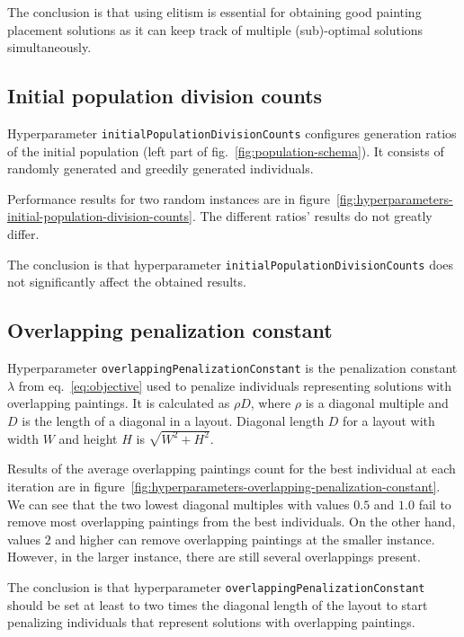The conclusion is that using elitism is essential for obtaining good painting placement solutions
as it can keep track of multiple (sub)-optimal solutions simultaneously.

\subsection{Initial population division counts}\label{subsec:initial-population-division-counts}
Hyperparameter \verb|initialPopulationDivisionCounts| configures generation ratios of the initial population (left part of fig.~\ref{fig:population-schema}).
It consists of randomly generated and greedily generated individuals.

Performance results for two random instances are in figure~\ref{fig:hyperparameters-initial-population-division-counts}.
The different ratios' results do not greatly differ.

The conclusion is that hyperparameter \verb|initialPopulationDivisionCounts| does not significantly affect the obtained results.

\subsection{Overlapping penalization constant}\label{subsec:overlapping-penalization-constant}

Hyperparameter \verb|overlappingPenalizationConstant| is the penalization constant $\lambda$ from eq.~\ref{eq:objective}
used to penalize individuals representing solutions with overlapping paintings.
It is calculated as $\rho D$, where $\rho$ is a diagonal multiple and $D$ is the length of a diagonal in a layout.
Diagonal length $D$ for a layout with width $W$ and height $H$ is $\sqrt{W^2 + H^2}$.

Results of the average overlapping paintings count for the best individual at each iteration are in figure~\ref{fig:hyperparameters-overlapping-penalization-constant}.
We can see that the two lowest diagonal multiples with values $0.5$ and $1.0$ fail to remove most overlapping paintings from the best individuals.
On the other hand, values $2$ and higher can remove overlapping paintings at the smaller instance.
However, in the larger instance, there are still several overlappings present.

The conclusion is that hyperparameter \verb|overlappingPenalizationConstant| should be set at least to
two times the diagonal length of the layout to start penalizing individuals that represent solutions with overlapping paintings.

